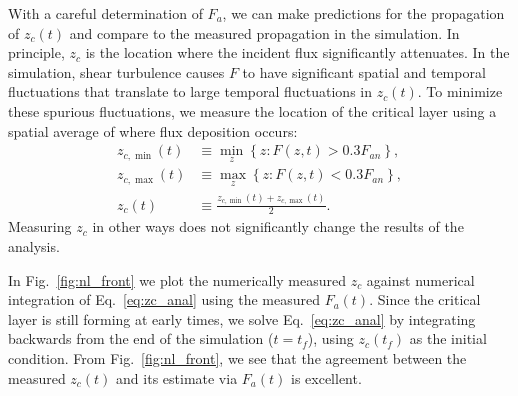 \documentclass[
        fleqn,
        usenatbib,
    ]{mnras}
\newcommand*{\z}[1]{\left\{#1\right\}}
\begin{document}
With a careful determination of $F_a$, we can make predictions for the
propagation of $z_c(t)$ and compare to the measured propagation in the
simulation. In principle, $z_c$ is the location where the incident flux
significantly attenuates. In the simulation, shear turbulence causes $F$ to have
significant spatial and temporal fluctuations that translate to large temporal
fluctuations in $z_c(t)$. To minimize these spurious fluctuations, we measure
the location of the critical layer using a spatial average of where flux
deposition occurs:
\begin{align}
    z_{c, \min}(t) &\equiv \min_z \z{z: F(z, t) > 0.3F_{an}},\\
    z_{c, \max}(t) &\equiv \max_z \z{z: F(z, t) < 0.3F_{an}},\\
    z_c(t) &\equiv \frac{z_{c, \min}(t) + z_{c, \max}(t)}{2}.\label{eq:zc_def}
\end{align}
Measuring $z_c$ in other ways does not significantly change the results of the
analysis.

In Fig.~\ref{fig:nl_front} we plot the numerically measured $z_c$ against
numerical integration of Eq.~\eqref{eq:zc_anal} using the measured $F_a(t)$.
Since the critical layer is still forming at early times, we solve
Eq.~\eqref{eq:zc_anal} by integrating backwards from the end of the simulation
($t = t_f$), using $z_c(t_f)$ as the initial condition. From
Fig.~\ref{fig:nl_front}, we see that the agreement between the measured $z_c(t)$
and its estimate via $F_a(t)$ is excellent.
\end{document}

